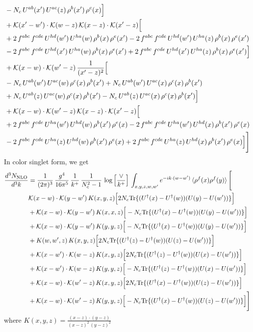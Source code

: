 \documentclass[9pt]{article}
\numberwithin{equation}{section}
\begin{document}
\begin{align}
& -N_{c}\,U^{ab}(x')\,U^{ac}(z)\,\rho^{b}(x')\,\rho^{c}(x)\Big]\notag\\
& +\mathcal{K}(x'-w')\cdot\mathcal{K}(w-z)\,\mathcal{K}(x-z)\cdot\mathcal{K}(x'-z)\Big[\notag\\
& +2\,f^{abc}\,f^{cde}\,U^{hd}(w')\,U^{ha}(w)\,\rho^{b}(x)\,\rho^{e}(x') -2\,f^{abc}\,f^{cde}\,U^{hd}(w')\,U^{ha}(z)\,\rho^{b}(x)\,\rho^{e}(x')\notag\\
& -2\,f^{abc}\,f^{cde}\,U^{hd}(x')\,U^{ha}(w)\,\rho^{b}(x)\,\rho^{e}(x') +2\,f^{abc}\,f^{cde}\,U^{hd}(x')\,U^{ha}(z)\,\rho^{b}(x)\,\rho^{e}(x')\Big]\notag\\
& +\mathcal{K}(x-w)\cdot\mathcal{K}(w'-z)\,\frac{1}{(x'-z)^{2}}\Big[\notag\\
& -N_{c}\,U^{ab}(w')\,U^{ac}(w)\,\rho^{c}(x)\,\rho^{b}(x') +N_{c}\,U^{ab}(w')\,U^{ac}(x)\,\rho^{c}(x)\,\rho^{b}(x')\notag\\
& +N_{c}\,U^{ab}(z)\,U^{ac}(w)\,\rho^{c}(x)\,\rho^{b}(x') -N_{c}\,U^{ab}(z)\,U^{ac}(x)\,\rho^{c}(x)\,\rho^{b}(x')\Big]\notag\\
& +\mathcal{K}(x-w)\cdot\mathcal{K}(w'-z)\,\mathcal{K}(x-z)\cdot\mathcal{K}(x'-z)\Big[\notag\\
& +2\,f^{abc}\,f^{cde}\,U^{ha}(w')\,U^{hd}(w)\,\rho^{b}(x')\,\rho^{e}(x) -2\,f^{abc}\,f^{cde}\,U^{ha}(w')\,U^{hd}(x)\,\rho^{b}(x')\,\rho^{e}(x)\notag\\
& -2\,f^{abc}\,f^{cde}\,U^{ha}(z)\,U^{hd}(w)\,\rho^{b}(x')\,\rho^{e}(x) +2\,f^{abc}\,f^{cde}\,U^{ha}(z)\,U^{hd}(x)\,\rho^{b}(x')\,\rho^{e}(x)\Big]\Bigg]
\end{align}
In color singlet form, we get
\begin{align}
\frac{d^{3}N_{\mathrm{NLO}}}{d^{3}k} & = \frac{1}{(2\pi)^{3}}\,\frac{g^{4}}{16\pi^{5}}\,\frac{1}{k^{+}}\,\frac{1}{N^{2}_{c}-1}\,\log\Big[\frac{\vee}{k^{+}}\Big]\,\int_{x,y,z,w,w'}e^{-ik\cdot(w-w')}\,\langle\rho^{f}(x)\rho^{f}(y) \rangle\,\Bigg[ \notag\\ & \mathcal K(x-w)\cdot\mathcal K(y-w')\,K(x,y,z)\Big[2 N_{c}{\rm Tr}\{(U^\dagger(x)-U^\dagger(w))(U(y)-U(w'))\}\Big]\notag\\
&+\mathcal K(x-w)\cdot\mathcal K(y-w')\,K(x,x,z)\Big[-N_{c}{\rm Tr}\{(U^\dagger(x)-U^\dagger(w))(U(y)-U(w'))\}\Big]\notag\\
&+\mathcal K(x-w)\cdot\mathcal K(y-w')\,K(y,y,z)\Big[-N_{c}{\rm Tr}\{(U^\dagger(x)-U^\dagger(w))(U(y)-U(w'))\}\Big]\notag\\
&+K(w,w',z)\,K(x,y,z)\Big[2 N_{c}{\rm Tr}\{(U^\dagger(z)-U^\dagger(w))(U(z)-U(w'))\}\Big]\notag\\
&+\mathcal K(x-w')\cdot\mathcal K(w-z)\,K(x,y,z)\Big[2 N_{c}{\rm Tr}\{(U^\dagger(z)-U^\dagger(w))(U(x)-U(w'))\}\Big]\notag\\
&+\mathcal K(x-w')\cdot\mathcal K(w-z)\,K(y,y,z)\Big[-N_{c}{\rm Tr}\{(U^\dagger(z)-U^\dagger(w))(U(x)-U(w'))\}\Big]\notag\\
&+\mathcal K(x-w)\cdot\mathcal K(w'-z)\,K(x,y,z)\Big[2 N_{c}{\rm Tr}\{(U^\dagger(x)-U^\dagger(w))(U(z)-U(w'))\}\Big]\notag\\
&+\mathcal K(x-w)\cdot\mathcal K(w'-z)\,K(y,y,z)\Big[-N_{c}{\rm Tr}\{(U^\dagger(x)-U^\dagger(w))(U(z)-U(w'))\}\Big]\Bigg]
\end{align}
where $K(x,y,z) = \frac{(x-z)\cdot (y-z)}{(x-z)^{2}\, (y-z)^{2}}$
\end{document}
